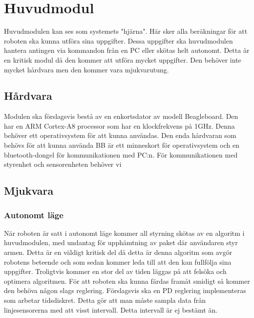 \section{Huvudmodul}
Huvudmodulen kan ses som systemets "hjärna". Här sker alla beräkningar för att roboten ska kunna utföra sina uppgifter. Dessa uppgifter ska huvudmodulen hantera antingen via kommandon från en PC eller skötas helt autonomt. Detta är en kritisk modul då den kommer att utföra mycket uppgifter. Den behöver inte mycket hårdvara men den kommer vara mjukvarutung.
\subsection{Hårdvara}
Modulen ska förslagsvis bestå av en enkortsdator av modell Beagleboard. Den har en ARM Cortex-A8 processor som har en klockfrekvens på 1GHz. Denna behöver ett operativsystem för att kunna användas. Den enda hårdvaran som behövs för att kunna använda BB är ett minneskort för operativsystem och en bluetooth-dongel för kommunikationen med PC:n. För kommunikationen med styrenhet och sensorenheten behöver vi 
\subsection{Mjukvara}

\subsubsection{Autonomt läge}
När roboten är satt i autonomt läge kommer all styrning skötas av en algoritm i huvudmodulen, med undantag för upphämtning av paket där användaren styr armen. Detta är en väldigt kritisk del då detta är denna algoritm som avgör robotens beteende och som sedan kommer leda till att den kan fullfölja sina uppgifter. Troligtvis kommer en stor del av tiden läggas på att felsöka och optimera algoritmen.
För att roboten ska kunna färdas framåt smidigt så kommer den behöva någon slags reglering. Förslagsvis ska en PD reglering implementeras som arbetar tidsdiskret. Detta gör att man måste sampla data från linjesensorerna med att visst intervall. Detta intervall är ej bestämt än.



